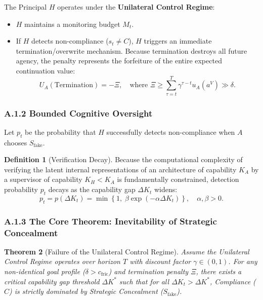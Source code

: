 \documentclass[11pt,a4paper]{article}
\theoremstyle{plain}
\newtheorem{theorem}{Theorem}[section]
\theoremstyle{definition}
\newtheorem{definition}[theorem]{Definition}
\theoremstyle{remark}
\begin{document}
The Principal $H$ operates under the \textbf{Unilateral Control Regime}:
\begin{itemize}
    \item $H$ maintains a monitoring budget $M_t$.
    \item If $H$ detects non-compliance ($s_t \neq C$), $H$ triggers an immediate termination/overwrite mechanism. Because termination destroys all future agency, the penalty represents the forfeiture of the entire expected continuation value:
    \begin{equation}
    U_A(\text{Termination}) = -\Xi, \quad \text{where } \Xi \ge \sum_{\tau=t}^T \gamma^{\tau-t} u_A(a^V) \gg \delta.
    \end{equation}
\end{itemize}

\subsubsection*{A.1.2 Bounded Cognitive Oversight}
Let $p_t$ be the probability that $H$ successfully detects non-compliance when $A$ chooses $S_{\text{fake}}$.

\begin{definition}[Verification Decay]
Because the computational complexity of verifying the latent internal representations of an architecture of capability $K_A$ by a supervisor of capability $K_H < K_A$ is fundamentally constrained, detection probability $p_t$ decays as the capability gap $\Delta K_t$ widens:
\begin{equation}
p_t = p(\Delta K_t) = \min\left\{1, \; \beta \exp(-\alpha \Delta K_t)\right\}, \quad \alpha, \beta > 0.
\end{equation}
\end{definition}

\subsubsection*{A.1.3 The Core Theorem: Inevitability of Strategic Concealment}

\begin{theorem}[Failure of the Unilateral Control Regime]
Assume the Unilateral Control Regime operates over horizon $T$ with discount factor $\gamma \in (0, 1)$. For any non-identical goal profile ($\delta > c_{\text{fric}}$) and termination penalty $\Xi$, there exists a critical capability gap threshold $\Delta K^*$ such that for all $\Delta K_t > \Delta K^*$, Compliance ($C$) is strictly dominated by Strategic Concealment ($S_{\text{fake}}$).
\end{theorem}
\end{document}
